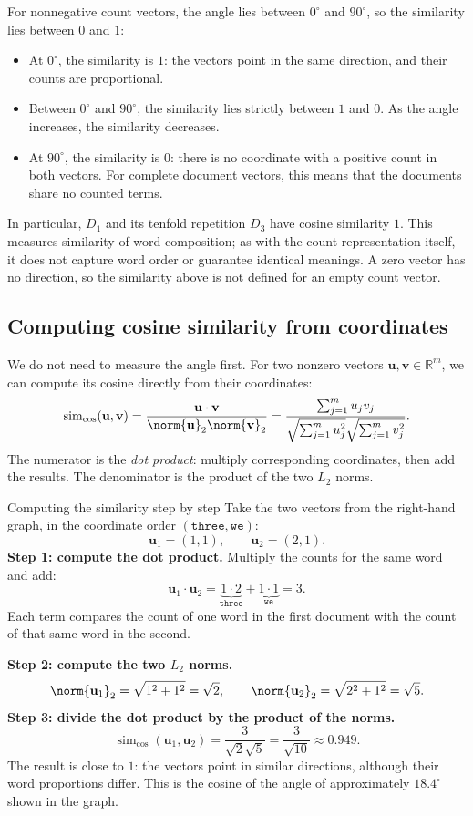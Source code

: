 \documentclass[a4paper,12pt,oneside]{report}
\begin{document}
For nonnegative count vectors, the angle lies between $0^\circ$ and
$90^\circ$, so the similarity lies between $0$ and $1$:
\begin{itemize}
  \item At $0^\circ$, the similarity is $1$: the vectors point in the
    same direction, and their counts are proportional.
  \item Between $0^\circ$ and $90^\circ$, the similarity lies strictly
    between $1$ and $0$. As the angle increases, the similarity decreases.
  \item At $90^\circ$, the similarity is $0$: there is no coordinate
    with a positive count in both vectors. For complete document
    vectors, this means that the documents share no counted terms.
\end{itemize}
In particular, $D_1$ and its tenfold repetition $D_3$ have cosine
similarity $1$. This measures similarity of word composition; as with
the count representation itself, it does not capture word order or
guarantee identical meanings. A zero vector has no direction, so the
similarity above is not defined for an empty count vector.

\subsection{Computing cosine similarity from coordinates}

We do not need to measure the angle first. For two nonzero vectors
$\mathbf u,\mathbf v\in\mathbb R^m$, we can compute its cosine directly
from their coordinates:
\[
  \operatorname{sim}_{\cos}(\mathbf u,\mathbf v)
  =\frac{\mathbf u\cdot\mathbf v}{\norm{\mathbf u}_2\norm{\mathbf v}_2}
  =\frac{\sum_{j=1}^{m}u_jv_j}
    {\sqrt{\sum_{j=1}^{m}u_j^2}\sqrt{\sum_{j=1}^{m}v_j^2}}.
\]
\label{sec:dot-product}
The numerator is the \emph{dot product}: multiply corresponding
coordinates, then add the results. The denominator is the product of
the two $L_2$ norms.

\begin{framedexample}{Computing the similarity step by step}
Take the two vectors from the right-hand graph, in the coordinate order
$(\texttt{three},\texttt{we})$:
\[
  \mathbf u_1=(1,1),\qquad\mathbf u_2=(2,1).
\]
\textbf{Step 1: compute the dot product.}
Multiply the counts for the same word and add:
\[
  \mathbf u_1\cdot\mathbf u_2
  =\underbrace{1\cdot2}_{\texttt{three}}
   +\underbrace{1\cdot1}_{\texttt{we}}=3.
\]
Each term compares the count of one word in the first document with
the count of that same word in the second.

\textbf{Step 2: compute the two $L_2$ norms.}
\[
  \norm{\mathbf u_1}_2=\sqrt{1^2+1^2}=\sqrt2,\qquad
  \norm{\mathbf u_2}_2=\sqrt{2^2+1^2}=\sqrt5.
\]
\textbf{Step 3: divide the dot product by the product of the norms.}
\[
  \operatorname{sim}_{\cos}(\mathbf u_1,\mathbf u_2)
  =\frac{3}{\sqrt2\sqrt5}
  =\frac{3}{\sqrt{10}}\approx0.949.
\]
The result is close to $1$: the vectors point in similar directions,
although their word proportions differ. This is the cosine of the
angle of approximately $18.4^\circ$ shown in the graph.
\end{framedexample}
\end{document}

